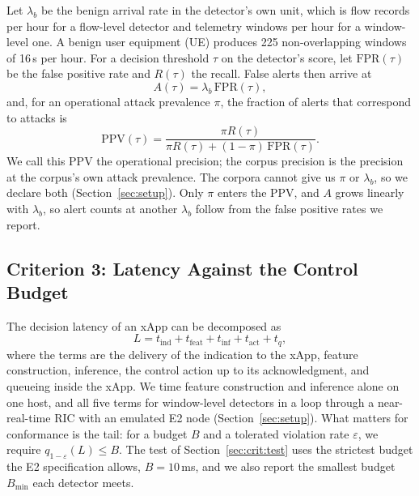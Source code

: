 \documentclass{ieeeaccess}
\begin{document}
Let $\lambda_{b}$ be the benign arrival rate in the detector's own unit, which is flow records per hour for a flow-level detector and telemetry windows per hour for a window-level one. A benign user equipment (UE) produces 225 non-overlapping windows of 16\,s per hour. For a decision threshold $\tau$ on the detector's score, let $\mathrm{FPR}(\tau)$ be the false positive rate and $R(\tau)$ the recall. False alerts then arrive at
\begin{equation}
A(\tau) = \lambda_{b}\,\mathrm{FPR}(\tau),
\label{eq:alerts}
\end{equation}
and, for an operational attack prevalence $\pi$, the fraction of alerts that correspond to attacks is
\begin{equation}
\mathrm{PPV}(\tau) = \frac{\pi R(\tau)}{\pi R(\tau) + (1-\pi)\,\mathrm{FPR}(\tau)}.
\label{eq:ppv}
\end{equation}
We call this PPV the operational precision; the corpus precision is the precision at the corpus's own attack prevalence. The corpora cannot give us $\pi$ or $\lambda_{b}$, so we declare both (Section~\ref{sec:setup}). Only $\pi$ enters the PPV, and $A$ grows linearly with $\lambda_{b}$, so alert counts at another $\lambda_{b}$ follow from the false positive rates we report.

\subsection{Criterion 3: Latency Against the Control Budget}

The decision latency of an xApp can be decomposed as
\begin{equation}
L = t_{\mathrm{ind}} + t_{\mathrm{feat}} + t_{\mathrm{inf}} + t_{\mathrm{act}} + t_{q},
\label{eq:latency}
\end{equation}
where the terms are the delivery of the indication to the xApp, feature construction, inference, the control action up to its acknowledgment, and queueing inside the xApp. We time feature construction and inference alone on one host, and all five terms for window-level detectors in a loop through a near-real-time RIC with an emulated E2 node (Section~\ref{sec:setup}). What matters for conformance is the tail: for a budget $B$ and a tolerated violation rate $\varepsilon$, we require $q_{1-\varepsilon}(L) \le B$. The test of Section~\ref{sec:crit:test} uses the strictest budget the E2 specification allows, $B = 10$\,ms, and we also report the smallest budget $B_{\min}$ each detector meets.
\end{document}
